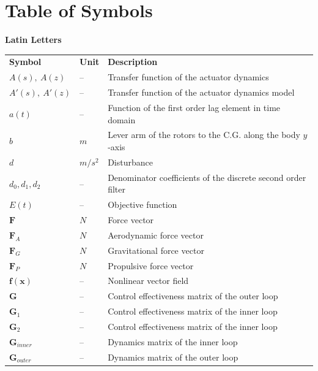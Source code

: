 \documentclass[11pt, a4paper, twoside]{report}
\begin{document}
\protect\thispagestyle{fancy_beginning}
\renewcommand{\chaptermark}[1]{\markboth{#1}{}}
\chaptermark{Table of Symbols}

\chapter*{Table of Symbols} \label{sec:table_of_symbols}

\textbf{Latin Letters}
\begin{table}[H]
  \begin{tabular}{p{2.5cm} p{1.5cm} p{10cm}} 
    \textbf{Symbol} & \textbf{Unit} & \textbf{Description} \\ [1.2ex] 
    $A(s),~A(z)$ & -- & Transfer function of the actuator dynamics \\ 
    $A'(s),~A'(z)$ & -- & Transfer function of the actuator dynamics model \\
    $a(t)$ & -- & Function of the first order lag element in time domain \\
    $b$ & $m$ & Lever arm of the rotors to the C.G. along the body $y$-axis \\
    $d$ & $m/s^2$ & Disturbance \\
    $d_0, d_1, d_2$ & -- & Denominator coefficients of the discrete second order filter \\
    $E(t)$ & -- & Objective function \\
    $\bm{F}$ & $N$ & Force vector \\
    $\bm{F}_A$ & $N$ & Aerodynamic force vector \\
    $\bm{F}_G$ & $N$ & Gravitational force vector \\
    $\bm{F}_P$ & $N$ & Propulsive force vector \\
    $\bm{f}(\bm{x})$ & -- & Nonlinear vector field \\
    $\bm{G}$ & -- & Control effectiveness matrix of the outer loop \\
    $\bm{G}_1$ & -- & Control effectiveness matrix of the inner loop \\
    $\bm{G}_2$ & -- & Control effectiveness matrix of the inner loop \\
    $\bm{G}_{inner}$ & -- & Dynamics matrix of the inner loop \\
    $\bm{G}_{outer}$ & -- & Dynamics matrix of the outer loop \\

\end{tabular}
\end{table}
\end{document}
